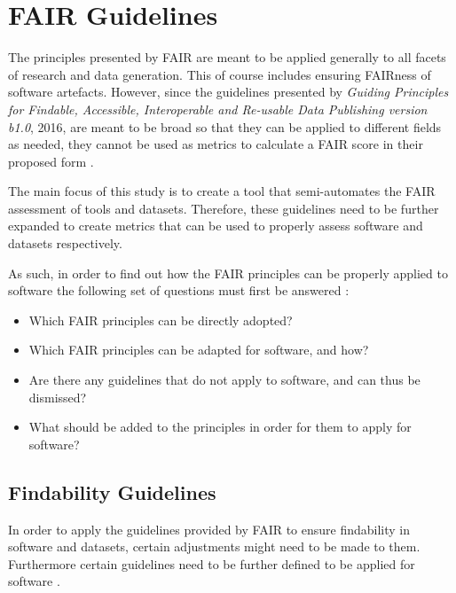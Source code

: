 \documentclass{cisfyp}
\begin{document}
\section{FAIR Guidelines}
The principles presented by FAIR are meant to be applied generally to all facets of research and data generation. This of course includes ensuring FAIRness of software artefacts. However, since the guidelines presented by \cite{Wilkinson2016} \textit{Guiding Principles for Findable, Accessible, Interoperable and Re-usable Data Publishing version b1.0}, 2016, are meant to be broad so that they can be applied to different fields as needed, they cannot be used as metrics to calculate a FAIR score in their proposed form \cite{dbcls}.

The main focus of this study is to create a tool that semi-automates the FAIR assessment of tools and datasets. Therefore, these guidelines need to be further expanded to create metrics that can be used to properly assess software and datasets respectively. 

As such, in order to find out how the FAIR principles can be properly applied to software the following set of questions must first be answered \cite{dbcls}:
\begin{itemize}
	\item Which FAIR principles can be directly adopted?
	\item Which FAIR principles can be adapted for software, and how?
	\item Are there any guidelines that do not apply to software, and can thus be dismissed?
	\item What should be added to the principles in order for them to apply for software?
\end{itemize}
\pagebreak
\subsection{Findability Guidelines}
In order to apply the guidelines provided by FAIR to ensure findability in software and datasets, certain adjustments might need to be made to them. Furthermore certain guidelines need to be further defined to be applied for software \cite{dbcls}.
\end{document}
